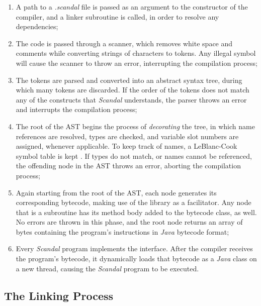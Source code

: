 \begin{enumerate}
	\item A path to a \emph{.scandal} file is passed as an argument to the constructor of the compiler, and a linker subroutine is called, in order to resolve any dependencies;
	\item The code is passed through a scanner, which removes white space and comments while converting strings of characters to tokens. Any illegal symbol will cause the scanner to throw an error, interrupting the compilation process;
	\item The tokens are parsed and converted into an abstract syntax tree, during which many tokens are discarded. If the order of the tokens does not match any of the constructs that \emph{Scandal} understands, the parser throws an error and interrupts the compilation process;
	\item The root of the AST begins the process of \emph{decorating} the tree, in which name references are resolved, types are checked, and variable slot numbers are assigned, whenever applicable. To keep track of names, a LeBlanc-Cook symbol table is kept \cite{Cook1983}. If types do not match, or names cannot be referenced, the offending node in the AST throws an error, aborting the compilation process;
	\item Again starting from the root of the AST, each node generates its corresponding bytecode, making use of the  library as a facilitator. Any node that is a subroutine has its method body added to the bytecode class, as well. No errors are thrown in this phase, and the root node returns an array of bytes containing the program's instructions in \emph{Java} bytecode format;
	\item Every \emph{Scandal} program implements the  interface. After the compiler receives the program's bytecode, it dynamically loads that bytecode as a \emph{Java} class on a new thread, causing the \emph{Scandal} program to be executed.
\end{enumerate}

\subsection{The Linking Process}

